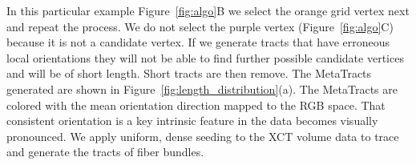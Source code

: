  In this particular example Figure~\ref{fig:algo}B we select the orange grid vertex next and repeat the process. We do not select the purple vertex (Figure~\ref{fig:algo}C) because it is not a candidate vertex. If we generate tracts that have erroneous local orientations they will not be able to find further possible candidate vertices and will be of short length. Short tracts are then remove. The MetaTracts generated are shown in Figure~\ref{fig:length_distribution}(a). The MetaTracts are colored with the mean orientation direction mapped to the RGB space. That consistent orientation is a key intrinsic feature in the data becomes visually pronounced.
 We apply uniform, dense seeding to the XCT volume data to trace and generate the tracts of fiber bundles. 
 
 
%
 


